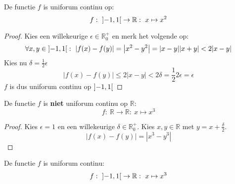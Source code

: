 \documentclass[main.tex]{subfiles}
\begin{document}
\begin{vb}
  De functie $f$ is uniforum continu op:
  \[ f:\ \interval[open]{-1}{1} \rightarrow \mathbb{R}:\ x \mapsto x^{2}\]
    \begin{figure}[H]
      \centering
    \end{figure}

  \begin{proof}
      Kies een willekeurige $\epsilon \in \mathbb{R}_{0}^{+}$ en merk het volgende op:
      \[ \forall x,y \in \interval[open]{-1}{1}:\ |f(x)-f(y)| = \left|x^{2}- y^{2}\right| = |x-y||x+y| < 2|x-y| \]
      Kies nu $\delta = \frac{1}{2}\epsilon$
      \[ |f(x)-f(y)| \le 2|x-y| < 2\delta = \frac{1}{2}2\epsilon = \epsilon\]
      $f$ is dus uniforum continu op $\interval[open]{-1}{1}$
  \end{proof}
\end{vb}

\begin{tvb}
  De functie $f$ is \textbf{niet} uniforum continu op $\mathbb{R}$:
  \[ f:\ \mathbb{R} \rightarrow \mathbb{R}:\ x \mapsto x^{3} \]
    \begin{figure}[H]
      \centering
    \end{figure}
    \begin{proof}
      Kies $\epsilon = 1$ en een willekeurige $\delta \in \mathbb{R}_{0}^{+}$.
      Kies $x, y \in \mathbb{R}$ met $y=x + \frac{\delta}{2}$.
      \[
      |f(x)-f(y)|
      = \left| x^{3}-y^{3}\right|
      \]
    \end{proof}
\end{tvb}

\begin{vb}
  De functie $f$ is uniforum continu:
  \[ f:\ \interval[open]{-1}{1} \rightarrow \mathbb{R}:\ x \mapsto x^{3} \]
    \begin{figure}[H]
      \centering
    \end{figure}
\end{vb}
\end{document}
